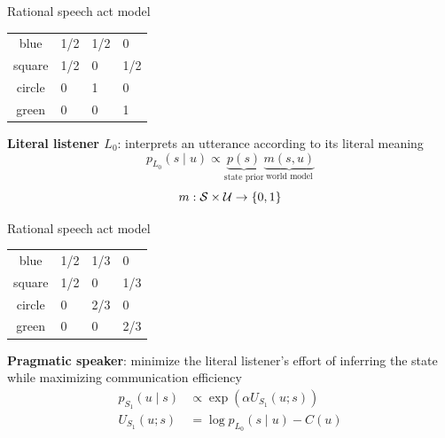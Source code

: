 \documentclass[usenames,dvipsnames,11pt,aspectratio=169]{beamer}
\begin{document}
\begin{frame}
    {Rational speech act model}
    \begin{center}

        \begin{tabular}{cp{2cm}p{2cm}p{2cm}}
        blue & 1/2 & 1/2 & 0 \\
        square & 1/2 & 0 & 1/2 \\
        circle & 0 & 1 & 0 \\
        green & 0 & 0 & 1
        \end{tabular}
    \end{center}
    \textbf{Literal listener $L_0$}: interprets an utterance according to its literal meaning
    $$
    p_{L_0}(s\mid u) \propto \underbrace{p(s)}_{\text{state prior}}
    \underbrace{m(s,u)}_{\text{world model}}
    $$
    $$
    m: \mathcal{S} \times \mathcal{U} \to \left\{ 0, 1 \right\}
    $$
\end{frame}

\begin{frame}
    {Rational speech act model}
    \begin{center}

        \begin{tabular}{cp{2cm}p{2cm}p{2cm}}
        blue   & 1/2 & 1/3   & 0 \\
        square & 1/2 & 0     & 1/3 \\
        circle & 0   & 2/3   & 0 \\
        green  & 0   & 0     & 2/3
        \end{tabular}
    \end{center}
    \textbf{Pragmatic speaker}: minimize the literal listener's effort of inferring the state while maximizing communication efficiency
    \begin{align*}
        p_{S_1}(u\mid s) &\propto \exp(\alpha U_{S_1}(u; s)) \\
        U_{S_1}(u; s) &= \log p_{L_0}(s\mid u) - C(u)
    \end{align*}
\end{frame}
\end{document}
